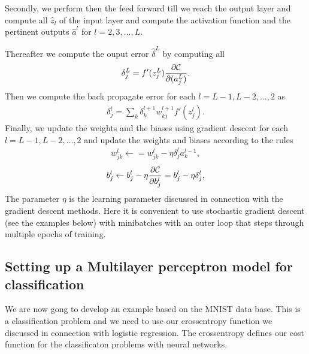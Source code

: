 \documentclass[letterpaper,10pt,english]{sphinxmanual}
\begin{document}
Secondly, we perform then the feed forward till we reach the output
layer and compute all \(\hat{z}_l\) of the input layer and compute the
activation function and the pertinent outputs \(\hat{a}^l\) for
\(l=2,3,\dots,L\).

Thereafter we compute the ouput error \(\hat{\delta}^L\) by computing all
\begin{equation*}
\begin{split}
\delta_j^L = f'(z_j^L)\frac{\partial {\cal C}}{\partial (a_j^L)}.
\end{split}
\end{equation*}
Then we compute the back propagate error for each \(l=L-1,L-2,\dots,2\) as
\begin{equation*}
\begin{split}
\delta_j^l = \sum_k \delta_k^{l+1}w_{kj}^{l+1}f'(z_j^l).
\end{split}
\end{equation*}
Finally, we update the weights and the biases using gradient descent for each \(l=L-1,L-2,\dots,2\) and update the weights and biases according to the rules
\begin{equation*}
\begin{split}
w_{jk}^l\leftarrow  = w_{jk}^l- \eta \delta_j^la_k^{l-1},
\end{split}
\end{equation*}\begin{equation*}
\begin{split}
b_j^l \leftarrow b_j^l-\eta \frac{\partial {\cal C}}{\partial b_j^l}=b_j^l-\eta \delta_j^l,
\end{split}
\end{equation*}
The parameter \(\eta\) is the learning parameter discussed in connection with the gradient descent methods.
Here it is convenient to use stochastic gradient descent (see the examples below) with mini\sphinxhyphen{}batches with an outer loop that steps through multiple epochs of training.


\subsection{Setting up a Multi\sphinxhyphen{}layer perceptron model for classification}
\label{\detokenize{chapter6:setting-up-a-multi-layer-perceptron-model-for-classification}}
We are now gong to develop an example based on the MNIST data
base. This is a classification problem and we need to use our
cross\sphinxhyphen{}entropy function we discussed in connection with logistic
regression. The cross\sphinxhyphen{}entropy defines our cost function for the
classificaton problems with neural networks.
\end{document}
